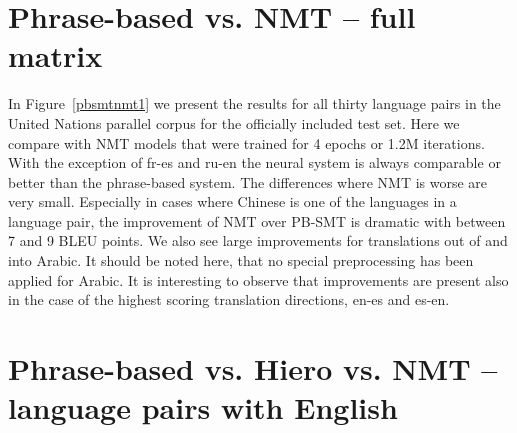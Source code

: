 \documentclass[11pt]{article}
\begin{document}
\section{Phrase-based vs. NMT -- full matrix}
In Figure~\ref{pbsmtnmt1} we present the results for all thirty language pairs in the United Nations parallel corpus for the officially included test set. Here we compare with NMT models that were trained for 4 epochs or 1.2M iterations. With the exception of fr-es and ru-en the neural system is always comparable or better than the phrase-based system. The differences where NMT is worse are very small. Especially in cases where Chinese is one of the languages in a language pair, the improvement of NMT over PB-SMT is dramatic with between 7 and 9 BLEU points. 
We also see large improvements for translations out of and into Arabic. It should be noted here, that no special preprocessing has been applied for Arabic. It is interesting to observe that improvements are present also in the case of the highest scoring translation directions, en-es and es-en.

\section{Phrase-based vs. Hiero vs. NMT -- language pairs with English}
\end{document}
